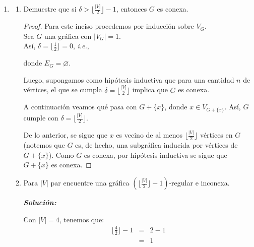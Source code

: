 \documentclass{article}
\begin{document}
\begin{enumerate}
  \item \begin{enumerate}

    \item Demuestre que si $\delta > \lfloor \frac{|V|}{2} \rfloor - 1$,
      entonces $G$ es conexa.

      \renewcommand\qedsymbol{QED}
      \begin{proof}
        Para este inciso procedemos por inducción sobre $V_G$. \\
        Sea $G$ una gráfica con $|V_G| = 1$. \\
        Así, $\delta = \lfloor \frac{1}{2} \rfloor = 0$, \textit{i.e.},

        \begin{figure}[ht!]
          \centering
        \end{figure}

        donde $E_G = \varnothing$.

        Luego, supongamos como hipótesis inductiva que para una cantidad $n$ de
        vértices, el que se cumpla $\delta = \lfloor \frac{|V|}{2} \rfloor$ implica
        que $G$ es conexa.

        A continuación veamos qué pasa con $G + \{x\}$, donde $x \in V_{G + \{x\}}$.
        Así, $G$ cumple con $\delta = \lfloor \frac{|V|}{2} \rfloor$.

        De lo anterior, se sigue que $x$ es vecino de al menos $\lfloor \frac{|V|}{2}
        \rfloor$ vértices en $G$ (notemos que $G$ es, de hecho, una subgráfica inducida
        por vértices de $G +\{x\}$). Como $G$ es conexa, por hipótesis inductiva se sigue
        que $G + \{x\}$ es conexa.
      \end{proof}

    \item Para $|V|$ par encuentre una gr\'afica $(\lfloor \frac{|V|}{2}
      \rfloor -1)$-regular e inconexa.

      \textbf{\textit{Solución:}}

      Con $|V| = 4$, tenemos que:
      \begin{eqnarray*}
        \lfloor \frac{4}{2} \rfloor -1 &=& 2 -1\\
        &=& 1
      \end{eqnarray*}


\end{enumerate}
\end{enumerate}
\end{document}
